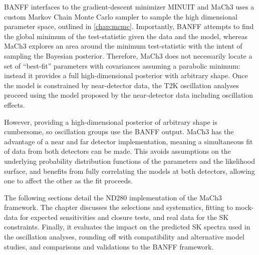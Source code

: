 BANFF interfaces to the gradient-descent minimizer MINUIT\cite{minuit} and MaCh3 uses a custom Markov Chain Monte Carlo sampler to sample the high dimensional parameter space, outlined in \autoref{chap:mcmc}. Importantly, BANFF attempts to find the global minimum of the test-statistic given the data and the model, whereas MaCh3 explores an area around the minimum test-statistic with the intent of sampling the Bayesian posterior. Therefore, MaCh3 does not necessarily locate a set of ``best-fit'' parameters with covariances assuming a parabolic minimum: instead it provides a full high-dimensional posterior with arbitrary shape. Once the model is constrained by near-detector data, the T2K oscillation analyses proceed using the model proposed by the near-detector data including oscillation effects.

However, providing a high-dimensional posterior of arbitrary shape is cumbersome, so oscillation groups use the BANFF output. MaCh3 has the advantage of a near and far detector implementation, meaning a simultaneous fit of data from both detectors can be made\cite{t2k_2015,thesis_elder, thesis_leila, thesis_kirsty, thesis_rich}. This avoids assumptions on the underlying probability distribution functions of the parameters and the likelihood surface, and benefits from fully correlating the models at both detectors, allowing one to affect the other as the fit proceeds.

The following sections detail the ND280 implementation of the MaCh3 framework. The chapter discusses the selections and systematics, fitting to mock-data for expected sensitivities and closure tests, and real data for the SK constraints. Finally, it evaluates the impact on the predicted SK spectra used in the oscillation analyses, rounding off with compatibility and alternative model studies, and comparisons and validations to the BANFF framework.
